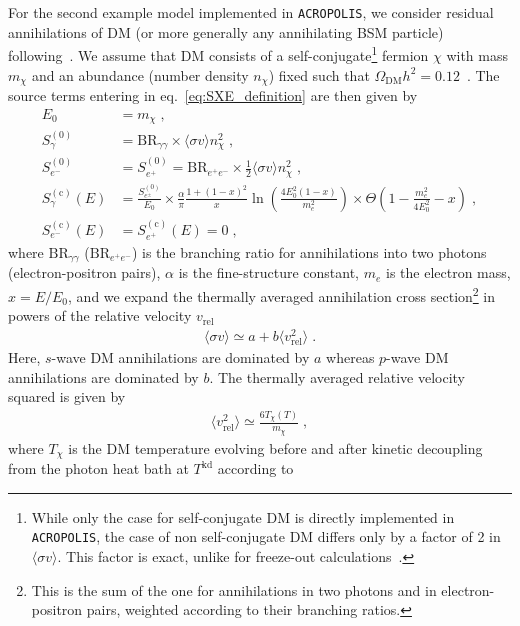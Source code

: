 \documentclass[11pt,a4paper]{article}
\newcommand{\eqsp}{\;}
\begin{document}
For the second example model implemented in \texttt{ACROPOLIS}, we consider residual annihilations of DM (or more generally any annihilating BSM particle) following~\cite{Depta:2019lbe}. We assume that DM consists of a self-conjugate\footnote{While only the case for self-conjugate DM is directly implemented in \texttt{ACROPOLIS}, the case of non self-conjugate DM differs only by a factor of 2 in $\langle \sigma v \rangle$. This factor is exact, unlike for freeze-out calculations~\cite{Bringmann:2020mgx}.} fermion $\chi$ with mass $m_\chi$ and an abundance (number density $n_\chi$) fixed such that $\Omega_\mathrm{DM} h^2 = 0.12$~\cite{Aghanim:2018eyx}.
The source terms entering in eq.~\eqref{eq:SXE_definition} are then given by~\cite{Depta:2019lbe}
\begin{align}
E_0 &= m_\chi \eqsp, \\
S_\gamma^{(0)} &= \text{BR}_{\gamma \gamma} \times \langle \sigma v \rangle n_\chi^2\eqsp, \\
S_{e^-}^{(0)} &= S_{e^+}^{(0)} = \text{BR}_{e^+ e^-} \times \frac{1}{2} \langle \sigma v \rangle n_\chi^2 \eqsp, \\
S_\gamma^{(\text{c})} (E) &=  \frac{S^{(0)}_{e^\pm}}{E_0} \times \frac{\alpha}{\pi} \frac{1 + (1-x)^2}{x} \ln \left( \frac{4 E_0^2 (1-x)}{m_e^2} \right) \times \Theta \left( 1 - \frac{m_e^2}{4 E_0^2} - x \right)\eqsp, \\
S_{e^-}^{(\text{c})} (E) &= S_{e^+}^{(\text{c})} (E) = 0\eqsp,
\end{align}
where $\text{BR}_{\gamma \gamma}$ ($\text{BR}_{e^+ e^-}$) is the branching ratio for annihilations into two photons (electron-positron pairs), $\alpha$ is the fine-structure constant, $m_e$ is the electron mass, $x = E/E_0$, and we expand the thermally averaged annihilation cross section\footnote{This is the sum of the one for annihilations in two photons and in electron-positron pairs, weighted according to their branching ratios.} in powers of the relative velocity $v_\mathrm{rel}$
\begin{align}
\langle \sigma v \rangle \simeq a + b \langle v_\mathrm{rel}^2 \rangle\eqsp.
\end{align}
Here, $s$-wave DM annihilations are dominated by $a$ whereas $p$-wave DM annihilations are dominated by $b$. The thermally averaged relative velocity squared is given by
\begin{align}
\langle v_\mathrm{rel}^2 \rangle \simeq \frac{6 T_\chi (T)}{m_\chi}\eqsp,
\end{align}
where $T_\chi$ is the DM temperature evolving before and after kinetic decoupling from the photon heat bath at $T^\mathrm{kd}$ according to
\end{document}
